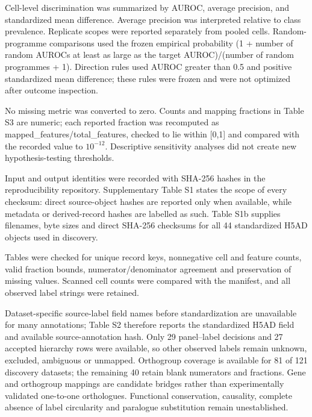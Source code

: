 
Cell-level discrimination was summarized by AUROC, average precision, and standardized mean difference. Average precision was interpreted relative to class prevalence. Replicate scopes were reported separately from pooled cells. Random-programme comparisons used the frozen empirical probability (1 + number of random AUROCs at least as large as the target AUROC)/(number of random programmes + 1). Direction rules used AUROC greater than 0.5 and positive standardized mean difference; these rules were frozen and were not optimized after outcome inspection.

No missing metric was converted to zero. Counts and mapping fractions in Table S3 are numeric; each reported fraction was recomputed as mapped\_features/total\_features, checked to lie within [0,1] and compared with the recorded value to $10^{-12}$. Descriptive sensitivity analyses did not create new hypothesis-testing thresholds.


Input and output identities were recorded with SHA-256 hashes in the reproducibility repository. Supplementary Table S1 states the scope of every checksum: direct source-object hashes are reported only when available, while metadata or derived-record hashes are labelled as such. Table S1b supplies filenames, byte sizes and direct SHA-256 checksums for all 44 standardized H5AD objects used in discovery.

Tables were checked for unique record keys, nonnegative cell and feature counts, valid fraction bounds, numerator/denominator agreement and preservation of missing values. Scanned cell counts were compared with the manifest, and all observed label strings were retained.


Dataset-specific source-label field names before standardization are unavailable for many annotations; Table S2 therefore reports the standardized H5AD field and available source-annotation hash. Only 29 panel--label decisions and 27 accepted hierarchy rows were available, so other observed labels remain unknown, excluded, ambiguous or unmapped. Orthogroup coverage is available for 81 of 121 discovery datasets; the remaining 40 retain blank numerators and fractions. Gene and orthogroup mappings are candidate bridges rather than experimentally validated one-to-one orthologues. Functional conservation, causality, complete absence of label circularity and paralogue substitution remain unestablished.

